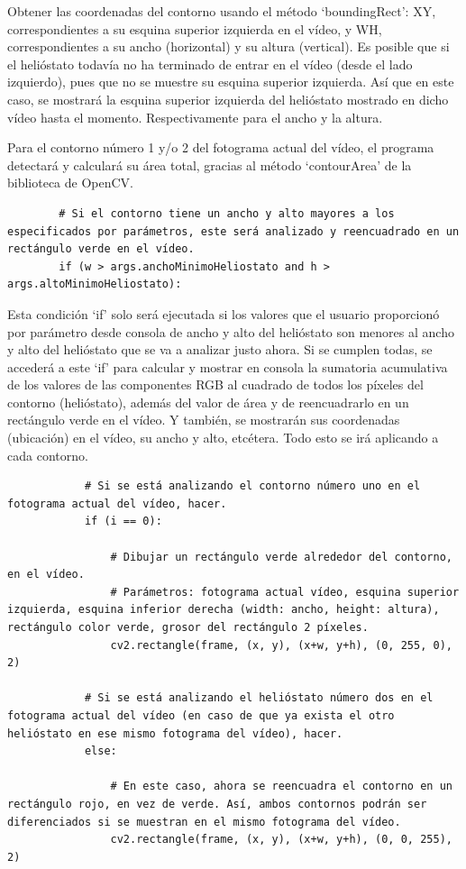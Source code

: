 Obtener las coordenadas del contorno usando el método ‘boundingRect’: XY, correspondientes a su esquina superior izquierda en el vídeo, y WH, correspondientes a su ancho (horizontal) y su altura (vertical). Es posible que si el helióstato todavía no ha terminado de entrar en el vídeo (desde el lado izquierdo), pues que no se muestre su esquina superior izquierda. Así que en este caso, se mostrará la esquina superior izquierda del helióstato mostrado en dicho vídeo hasta el momento. Respectivamente para el ancho y la altura.

Para el contorno número 1 y/o 2 del fotograma actual del vídeo, el programa detectará y calculará su área total, gracias al método ‘contourArea’ de la biblioteca de OpenCV.\\[20pt]

\begin{lstlisting}
        # Si el contorno tiene un ancho y alto mayores a los especificados por parámetros, este será analizado y reencuadrado en un rectángulo verde en el vídeo.
        if (w > args.anchoMinimoHeliostato and h > args.altoMinimoHeliostato):
\end{lstlisting}

Esta condición ‘if’ solo será ejecutada si los valores que el usuario proporcionó por parámetro desde consola de ancho y alto del helióstato son menores al ancho y alto del helióstato que se va a analizar justo ahora. Si se cumplen todas, se accederá a este ‘if’ para calcular y mostrar en consola la sumatoria acumulativa de los valores de las componentes RGB al cuadrado de todos los píxeles del contorno (helióstato), además del valor de área y de reencuadrarlo en un rectángulo verde en el vídeo. Y también, se mostrarán sus coordenadas (ubicación) en el vídeo, su ancho y alto, etcétera. Todo esto se irá aplicando a cada contorno.\\[20pt]            

\begin{lstlisting}
            # Si se está analizando el contorno número uno en el fotograma actual del vídeo, hacer.
            if (i == 0):

                # Dibujar un rectángulo verde alrededor del contorno, en el vídeo.
                # Parámetros: fotograma actual vídeo, esquina superior izquierda, esquina inferior derecha (width: ancho, height: altura), rectángulo color verde, grosor del rectángulo 2 píxeles.
                cv2.rectangle(frame, (x, y), (x+w, y+h), (0, 255, 0), 2)

            # Si se está analizando el helióstato número dos en el fotograma actual del vídeo (en caso de que ya exista el otro helióstato en ese mismo fotograma del vídeo), hacer.
            else:

                # En este caso, ahora se reencuadra el contorno en un rectángulo rojo, en vez de verde. Así, ambos contornos podrán ser diferenciados si se muestran en el mismo fotograma del vídeo.
                cv2.rectangle(frame, (x, y), (x+w, y+h), (0, 0, 255), 2)
\end{lstlisting}

